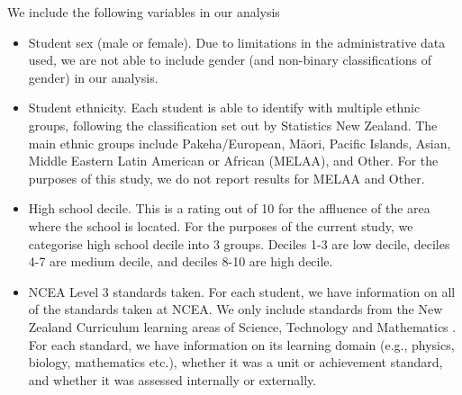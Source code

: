 We include the following variables in our analysis
\begin{itemize}
    \item Student sex (male or female). Due to limitations in the administrative data used, we are not able to include gender (and non-binary classifications of gender) in our analysis.
    \item Student ethnicity. Each student is able to identify with multiple ethnic groups, following the classification set out by Statistics New Zealand. The main ethnic groups include Pakeha/European, M\={a}ori, Pacific Islands, Asian, Middle Eastern Latin American or African (MELAA), and Other. For the purposes of this study, we do not report results for MELAA and Other.
    \item High school decile. This is a rating out of 10 for the affluence of the area where the school is located. For the purposes of the current study, we categorise high school decile into 3 groups. Deciles 1-3 are low decile, deciles 4-7 are medium decile, and deciles 8-10 are high decile. 
    \item NCEA Level 3 standards taken. For each student, we have information on all of the standards taken at NCEA. We only include standards from the New Zealand Curriculum learning areas of Science, Technology and Mathematics \cite{NZCurriculum2007}. For each standard, we have information on its learning domain (e.g., physics, biology, mathematics etc.), whether it was a unit or achievement standard, and whether it was assessed internally or externally.
\end{itemize}

